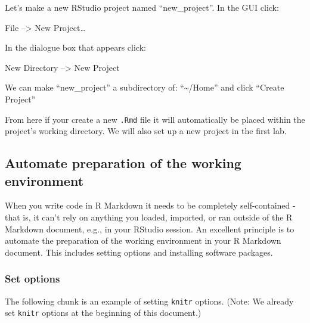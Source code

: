 \documentclass[
]{article}
\newenvironment{Shaded}{\begin{snugshade}}{\end{snugshade}}
\newcommand{\CommentTok}[1]{\textcolor[rgb]{0.56,0.35,0.01}{\textit{#1}}}
\newcommand{\DataTypeTok}[1]{\textcolor[rgb]{0.13,0.29,0.53}{#1}}
\newcommand{\KeywordTok}[1]{\textcolor[rgb]{0.13,0.29,0.53}{\textbf{#1}}}
\newcommand{\NormalTok}[1]{#1}
\newcommand{\OperatorTok}[1]{\textcolor[rgb]{0.81,0.36,0.00}{\textbf{#1}}}
\newcommand{\OtherTok}[1]{\textcolor[rgb]{0.56,0.35,0.01}{#1}}
\begin{document}
Let's make a new RStudio project named ``new\_project''. In the GUI
click:

File --\textgreater{} New Project\ldots{}

In the dialogue box that appears click:

New Directory --\textgreater{} New Project

We can make ``new\_project'' a subdirectory of: ``\textasciitilde/Home''
and click ``Create Project''

From here if your create a new \texttt{.Rmd} file it will automatically
be placed within the project's working directory. We will also set up a
new project in the first lab.

\hypertarget{automate-preparation-of-the-working-environment}{%
\subsection{Automate preparation of the working
environment}\label{automate-preparation-of-the-working-environment}}

When you write code in R Markdown it needs to be completely
self-contained - that is, it can't rely on anything you loaded,
imported, or ran outside of the R Markdown document, e.g., in your
RStudio session. An excellent principle is to automate the preparation
of the working environment in your R Markdown document. This includes
setting options and installing software packages.

\hypertarget{set-options}{%
\subsubsection{Set options}\label{set-options}}

The following chunk is an example of setting \texttt{knitr} options.
(Note: We already set \texttt{knitr} options at the beginning of this
document.)

\begin{Shaded}
\end{Shaded}
\end{document}
